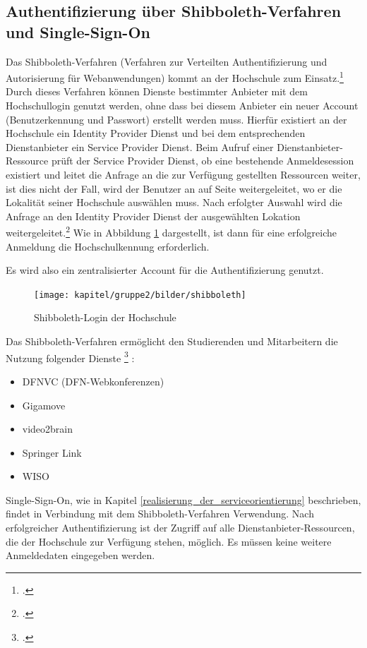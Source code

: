 \subsection{Authentifizierung über Shibboleth-Verfahren und Single-Sign-On}
\label{shibboleth_sso} 

Das Shibboleth-Verfahren (Verfahren zur Verteilten Authentifizierung und Autorisierung für Webanwendungen) kommt an der Hochschule zum Einsatz.\footcite[Vgl.][]{hsel_shibboleth_auth_2015}  Durch dieses Verfahren können Dienste bestimmter Anbieter mit dem Hochschullogin genutzt werden, ohne dass bei diesem Anbieter ein neuer Account (Benutzerkennung und Passwort) erstellt werden muss. Hierfür existiert an der Hochschule ein Identity Provider Dienst und bei dem entsprechenden Dienstanbieter ein Service Provider Dienst.  Beim Aufruf einer Dienstanbieter-Ressource prüft der Service Provider Dienst, ob eine bestehende Anmeldesession existiert und leitet die Anfrage an die zur Verfügung gestellten Ressourcen weiter, ist dies nicht der Fall, wird der Benutzer an auf Seite weitergeleitet, wo er die Lokalität seiner Hochschule auswählen muss. Nach erfolgter Auswahl wird die Anfrage an den Identity Provider Dienst der ausgewählten Lokation weitergeleitet.\footcite[Vgl.][]{kit_shibboleth_2012} Wie in Abbildung \ref{fig_shibboleth_hs} dargestellt, ist dann für eine erfolgreiche Anmeldung die Hochschulkennung erforderlich.

Es wird also ein zentralisierter Account für die Authentifizierung genutzt.  

\begin{figure}
	\centering
	\texttt{[image: kapitel/gruppe2/bilder/shibboleth]}
	\caption{Shibboleth-Login der Hochschule \protect\footnotemark}
	\label{fig_shibboleth_hs}
\end{figure}

Das Shibboleth-Verfahren ermöglicht den Studierenden und Mitarbeitern die Nutzung folgender Dienste \footcite{hsel_shibboleth_vpn_2015} :

\begin{itemize}
	\item DFNVC (DFN-Webkonferenzen)
	\item Gigamove
	\item video2brain
	\item Springer Link	
	\item WISO	
\end{itemize}

Single-Sign-On, wie in Kapitel \ref{realisierung_der_serviceorientierung} beschrieben, findet in Verbindung mit dem Shibboleth-Verfahren Verwendung. Nach erfolgreicher Authentifizierung ist der Zugriff auf alle Dienstanbieter-Ressourcen, die der Hochschule zur Verfügung stehen, möglich. Es müssen keine weitere Anmeldedaten eingegeben werden.

